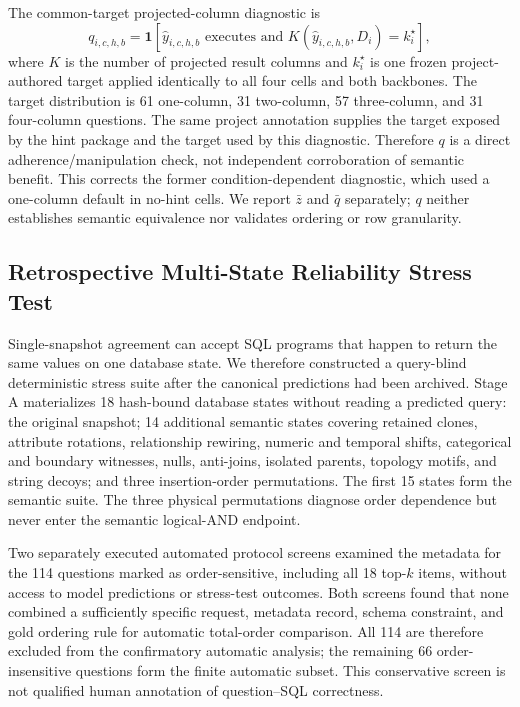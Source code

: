 \documentclass[applsci,article,submit,moreauthors]{Definitions/mdpi}
\begin{document}
The common-target projected-column diagnostic is
\begin{equation}
q_{i,c,h,b}=\mathbf{1}[\widehat y_{i,c,h,b}\text{ executes and }K(\widehat y_{i,c,h,b},D_i)=k_i^\star],
\end{equation}
where $K$ is the number of projected result columns and $k_i^\star$ is one frozen project-authored target applied identically to all four cells and both backbones. The target distribution is 61 one-column, 31 two-column, 57 three-column, and 31 four-column questions. The same project annotation supplies the target exposed by the hint package and the target used by this diagnostic. Therefore $q$ is a direct adherence/manipulation check, not independent corroboration of semantic benefit. This corrects the former condition-dependent diagnostic, which used a one-column default in no-hint cells. We report $\bar z$ and $\bar q$ separately; $q$ neither establishes semantic equivalence nor validates ordering or row granularity.

\subsection{Retrospective Multi-State Reliability Stress Test}
Single-snapshot agreement can accept SQL programs that happen to return the same values on one database state. We therefore constructed a query-blind deterministic stress suite after the canonical predictions had been archived. Stage A materializes 18 hash-bound database states without reading a predicted query: the original snapshot; 14 additional semantic states covering retained clones, attribute rotations, relationship rewiring, numeric and temporal shifts, categorical and boundary witnesses, nulls, anti-joins, isolated parents, topology motifs, and string decoys; and three insertion-order permutations. The first 15 states form the semantic suite. The three physical permutations diagnose order dependence but never enter the semantic logical-AND endpoint.

Two separately executed automated protocol screens examined the metadata for the 114 questions marked as order-sensitive, including all 18 top-$k$ items, without access to model predictions or stress-test outcomes. Both screens found that none combined a sufficiently specific request, metadata record, schema constraint, and gold ordering rule for automatic total-order comparison. All 114 are therefore excluded from the confirmatory automatic analysis; the remaining 66 order-insensitive questions form the finite automatic subset. This conservative screen is not qualified human annotation of question--SQL correctness.
\end{document}
